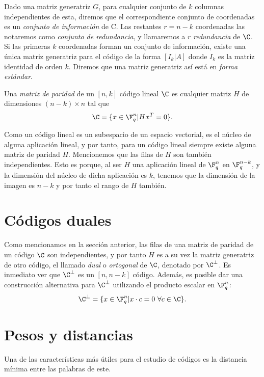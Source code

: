 Dado una matriz generatriz \(G\), para cualquier conjunto de \(k\) columnas independientes de esta, diremos que el correspondiente conjunto de coordenadas es un \textit{conjunto de información} de C. Las restantes \(r=n-k\) coordenadas las notaremos como \textit{conjunto de redundancia}, y llamaremos a \(r\) \textit{redundancia} de \(\C\). Si las primeras \(k\) coordenadas forman un conjunto de información, existe una única matriz generatriz para el código de la forma \([I_k | A]\) donde \(I_k\) es la matriz identidad de orden \(k\). Diremos que una matriz generatriz así está en \textit{forma estándar}.

\begin{definition}
    Una \textit{matriz de paridad } de un \([n,k]\) código lineal \(\C\) es cualquier matriz \(H\) de dimensiones \((n-k)\times n\) tal que
    \[
    \C = \{x \in \F_q^n | Hx^T = 0\}
    .\]
\end{definition}

Como un código lineal es un subespacio de un espacio vectorial, es el núcleo de alguna aplicación lineal, y por tanto, para un código lineal siempre existe alguna matriz de paridad \(H\). Mencionemos que las filas de \(H\) son también independientes. Esto es porque, al ser \(H\) una aplicación lineal de \(\F_q^n\) en  \(\F_q^{n-k}\), y la dimensión del núcleo de dicha aplicación es \(k\), tenemos que la dimensión de la imagen es \(n-k\) y por tanto el rango de \(H\) también.

\section{Códigos duales}%
\label{sec:códigos_duales}

Como mencionamos en la sección anterior, las filas de una matriz de paridad de un código \(\C\) son independientes, y por tanto \(H\) es a su vez la matriz generatriz de otro código, el llamado \textit{dual} o \textit{ortogonal} de \(\C\), denotado por \(\C^\bot\). Es inmediato ver que \(\C^\bot\) es un \([n, n-k]\) código. Además, es posible dar una construcción alternativa para \(\C^\bot\) utilizando el producto escalar en  \(\F_q^n\):
\[
\C^\bot = \{x \in \F_q^n | x \cdot c = 0\ \forall c \in \C\}
.\]

\section{Pesos y distancias}
Una de las características más útiles para el estudio de códigos es la distancia mínima entre las palabras de este.

